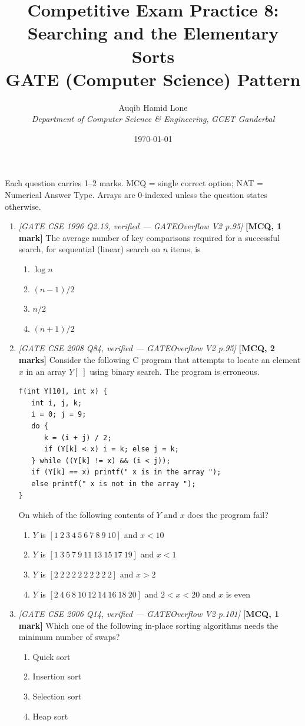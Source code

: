 \documentclass[11pt]{article}
\title{Competitive Exam Practice 8: Searching and the Elementary Sorts\\\large GATE (Computer Science) Pattern}
\author{Auqib Hamid Lone\\[0.3em]
  \emph{Department of Computer Science \& Engineering}, \emph{GCET Ganderbal}}
\date{\today}
\begin{document}
\maketitle

\noindent Each question carries 1--2 marks. MCQ = single correct option; NAT = Numerical Answer Type. Arrays are 0-indexed unless the question states otherwise.

\begin{enumerate}
\item[\textbf{Q1}] \textit{[GATE CSE 1996 Q2.13, verified --- GATEOverflow V2 p.95]} \textbf{[MCQ, 1 mark]} The average number of key comparisons required for a successful search, for sequential (linear) search on $n$ items, is
\begin{enumerate}
  \item[(A)] $\log n$
  \item[(B)] $(n-1)/2$
  \item[(C)] $n/2$
  \item[(D)] $(n+1)/2$
\end{enumerate}

\item[\textbf{Q2}] \textit{[GATE CSE 2008 Q84, verified --- GATEOverflow V2 p.95]} \textbf{[MCQ, 2 marks]} Consider the following C program that attempts to locate an element $x$ in an array $Y[\;]$ using binary search. The program is erroneous.
\begin{verbatim}
f(int Y[10], int x) {
   int i, j, k;
   i = 0; j = 9;
   do {
      k = (i + j) / 2;
      if (Y[k] < x) i = k; else j = k;
   } while ((Y[k] != x) && (i < j));
   if (Y[k] == x) printf(" x is in the array ");
   else printf(" x is not in the array ");
}
\end{verbatim}
On which of the following contents of $Y$ and $x$ does the program fail?
\begin{enumerate}
  \item[(A)] $Y$ is $[1\ 2\ 3\ 4\ 5\ 6\ 7\ 8\ 9\ 10]$ and $x < 10$
  \item[(B)] $Y$ is $[1\ 3\ 5\ 7\ 9\ 11\ 13\ 15\ 17\ 19]$ and $x < 1$
  \item[(C)] $Y$ is $[2\ 2\ 2\ 2\ 2\ 2\ 2\ 2\ 2\ 2]$ and $x > 2$
  \item[(D)] $Y$ is $[2\ 4\ 6\ 8\ 10\ 12\ 14\ 16\ 18\ 20]$ and $2 < x < 20$ and $x$ is even
\end{enumerate}

\item[\textbf{Q3}] \textit{[GATE CSE 2006 Q14, verified --- GATEOverflow V2 p.101]} \textbf{[MCQ, 1 mark]} Which one of the following in-place sorting algorithms needs the minimum number of swaps?
\begin{enumerate}
  \item[(A)] Quick sort
  \item[(B)] Insertion sort
  \item[(C)] Selection sort
  \item[(D)] Heap sort
\end{enumerate}


\end{enumerate}
\end{document}
